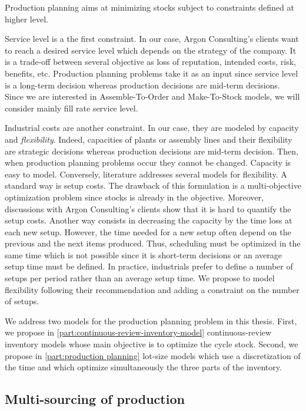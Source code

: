 \medskip


Production planning aims at minimizing stocks subject to constraints defined at higher level.


Service level is a the first constraint.
In our case, Argon Consulting's clients want to reach a desired service level which depends on the strategy of the company.
It is a trade-off between several objective as loss of reputation, intended costs, risk, benefits, etc.
Production planning problems take it as an input since service level is a long-term decision whereas production decisions are mid-term decisions.
Since we are interested in Assemble-To-Order and Make-To-Stock models, we will consider mainly fill rate service level.


Industrial costs are another constraint.
In our case, they are modeled by capacity and \emph{flexibility}.
Indeed, capacities of plants or assembly lines and their flexibility are strategic decisions whereas production decisions are mid-term decision.
Then, when production planning problems occur they cannot be changed.
Capacity is easy to model.
Conversely, literature addresses several models for flexibility.
A standard way is setup costs.
The drawback of this formulation is a multi-objective optimization problem since stocks is already in the objective.
Moreover, discussions with Argon Consulting's clients show that it is hard to quantify the setup costs.
Another way consists in decreasing the capacity by the time loss at each new setup.
However, the time needed for a new setup often depend on the previous and the next items produced.
Thus, scheduling must be optimized in the same time which is not possible since it is short-term decisions or an average setup time must be defined.
In practice, industrials prefer to define a number of setups per period rather than an average setup time.
We propose to model flexibility following their recommendation and adding a constraint on the number of setups.


\medskip


We address two models for the production planning problem in this thesis.
First, we propose in \cref{part:continuous-review-inventory-model} continuous-review inventory models whose main objective is to optimize the cycle stock.
Second, we propose in \cref{part:production planning} lot-size models which use a discretization of the time and which optimize simultaneously the three parts of the inventory.



\subsection{Multi-sourcing of production}
\label{sec:business-context:argon:multi-sourcing}


